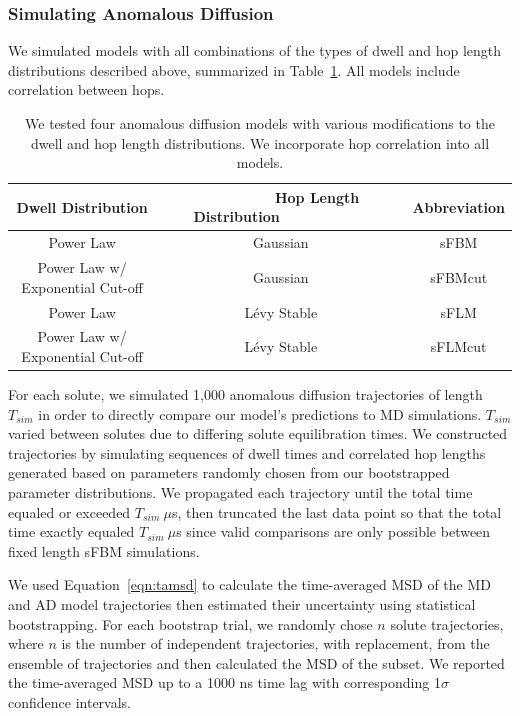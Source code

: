 \documentclass[journal=jctcce,manuscript=article]{achemso}
\begin{document}
  \subsubsection*{Simulating Anomalous Diffusion}

  We simulated models with all combinations of the types of dwell and hop length
  distributions described above, summarized in Table~\ref{table:anomalous_models}.
  All models include correlation between hops.

  \begin{table}[!htb]
	  \centering
	  \begin{tabular}{ccc}
            \hline
	  \hline
	  Dwell Distribution                & ~~~~~~~~~Hop Length Distribution~~~~~~~~~~~ & Abbreviation \\
	  \hline
      Power Law                         & Gaussian                & sFBM         \\
      Power Law w/ Exponential Cut-off  & Gaussian                & sFBMcut      \\
      Power Law                         & L\'evy Stable           & sFLM         \\
      Power Law w/ Exponential Cut-off  & L\'evy Stable           & sFLMcut      \\
	  \hline
          \hline
	  \end{tabular}
	  \caption{We tested four anomalous diffusion models with various modifications 
	  to the dwell and hop length distributions. We incorporate hop correlation 
	  into all models.}\label{table:anomalous_models}
          
 \end{table}

  For each solute, we simulated 1,000 anomalous diffusion trajectories of
  length $T_{sim}$ in order to directly compare our model's predictions to MD
  simulations. $T_{sim}$ varied between solutes due to differing solute
  equilibration times. We constructed trajectories by simulating sequences of
  dwell times and correlated hop lengths generated based on parameters randomly
  chosen from our bootstrapped parameter distributions. We propagated each
  trajectory until the total time equaled or exceeded $T_{sim}~ \mu$s, then
  truncated the last data point so that the total time exactly equaled
  $T_{sim}~ \mu$s since valid comparisons are only possible between fixed
  length sFBM simulations. 
  
  We used Equation~\ref{eqn:tamsd} to calculate the time-averaged MSD of the MD
  and AD model trajectories then estimated their uncertainty using statistical
  bootstrapping. For each bootstrap trial, we randomly chose $n$ solute
  trajectories, where $n$ is the number of independent trajectories, with
  replacement, from the ensemble of trajectories and then calculated the MSD of
  the subset. We reported the time-averaged MSD up to a 1000 ns time lag with
  corresponding 1$\sigma$ confidence intervals. 
\end{document}
